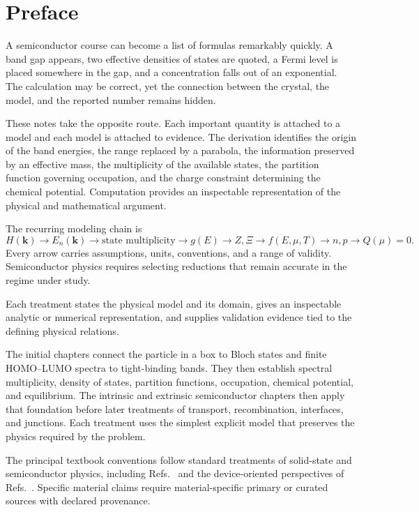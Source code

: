 \chapter*{Preface}

A semiconductor course can become a list of formulas remarkably quickly.  A
band gap appears, two effective densities of states are quoted, a Fermi level
is placed somewhere in the gap, and a concentration falls out of an
exponential.  The calculation may be correct, yet the connection between the
crystal, the model, and the reported number remains hidden.

These notes take the opposite route.  Each important quantity is attached to a
model and each model is attached to evidence.  The derivation identifies the
origin of the band energies, the range replaced by a parabola, the information
preserved by an effective mass, the multiplicity of the available states, the
partition function governing occupation, and the charge constraint determining
the chemical potential.  Computation provides an inspectable representation of
the physical and mathematical argument.

The recurring modeling chain is
\begin{equation*}
  H(\bm k)
  \longrightarrow E_n(\bm k)
  \longrightarrow \text{state multiplicity}
  \longrightarrow g(E)
  \longrightarrow Z,\Xi
  \longrightarrow f(E,\mu,T)
  \longrightarrow n,p
  \longrightarrow Q(\mu)=0.
\end{equation*}
Every arrow carries assumptions, units, conventions, and a range of validity.
Semiconductor physics requires selecting reductions that remain accurate in the
regime under study.

Each treatment states the physical model and its domain, gives an inspectable
analytic or numerical representation, and supplies validation evidence tied to
the defining physical relations.

The initial chapters connect the particle in a box to Bloch states and finite
HOMO--LUMO spectra to tight-binding bands.  They then establish spectral
multiplicity, density of states, partition functions, occupation, chemical
potential, and equilibrium.  The intrinsic and extrinsic semiconductor chapters
then apply
that foundation before later treatments of transport, recombination,
interfaces, and junctions.  Each treatment uses the simplest explicit model
that preserves the physics required by the problem.

The principal textbook conventions follow standard treatments of solid-state
and semiconductor physics, including Refs.~\cite{kittel2005,neamen2012,yu2010}
and the device-oriented perspectives of Refs.~\cite{szeLee2012,szeNg2007}.  Specific material
claims require material-specific primary or curated sources with declared
provenance.
